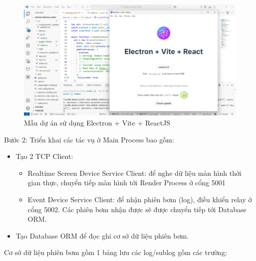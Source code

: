 \begin{figure}[!ht]
     \centering
    \includegraphics[width=1.0\linewidth]{Figures/ElectronViteReact-template.png}
    \caption{Mẫu dự án sử dụng Electron + Vite + ReactJS}
    \label{fig:ElectronViteReact-template}
\end{figure}

\FloatBarrier

Bước 2: Triển khai các tác vụ ở Main Process bao gồm:

\begin{itemize}
    \item Tạo 2 TCP Client:
    \begin{itemize}
        \item Realtime Screen Device Service Client: để nghe dữ liệu màn hình thời gian thực, chuyển tiếp màn hình tới Render Process ở cổng 5001
        \item Event Device Service Client: để nhận phiên bơm (log), điều khiển relay ở cổng 5002. Các phiên bơm nhận được sẽ được chuyển tiếp tới Database ORM.
    \end{itemize}
    \item Tạo Database ORM để đọc ghi cơ sở dữ liệu phiên bơm.
\end{itemize}

Cơ sở dữ liệu phiên bơm gồm 1 bảng lưu các log/sublog gồm các trường:

